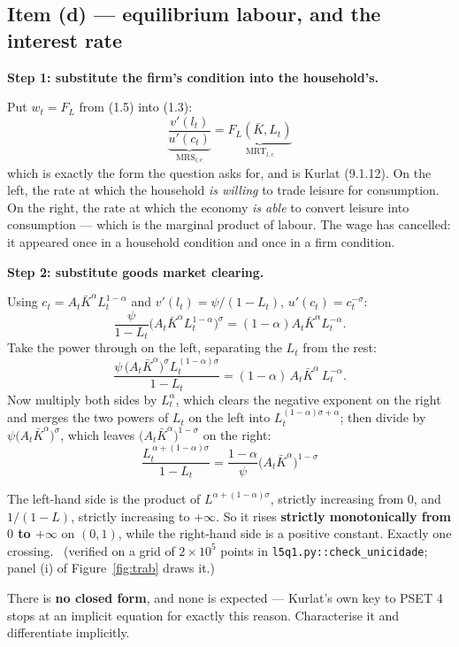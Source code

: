 \documentclass[11pt, a4paper]{article}
\newcommand{\passo}[1]{\medskip\noindent\textbf{#1}\par\nobreak}
\newcommand{\MRS}{\mathrm{MRS}}
\newcommand{\MRT}{\mathrm{MRT}}
\newcommand{\Kb}{\bar K}
\begin{document}
\subsection*{Item (d) --- equilibrium labour, and the interest rate}

\passo{Step 1: substitute the firm's condition into the household's.} Put $w_t=F_L$ from
(1.5) into (1.3):
\[
\boxed{\;
\underbrace{\frac{v'(l_t)}{u'(c_t)}}_{\textstyle \MRS_{l,c}}
=\underbrace{F_L(\Kb,L_t)}_{\textstyle \MRT_{l,c}}\;}
\tag{1.7}
\]
which is exactly the form the question asks for, and is Kurlat (9.1.12). On the left, the
rate at which the household \emph{is willing} to trade leisure for consumption. On the
right, the rate at which the economy \emph{is able} to convert leisure into consumption ---
which is the marginal product of labour. The wage has cancelled: it appeared once in a
household condition and once in a firm condition.

\passo{Step 2: substitute goods market clearing.} Using $c_t=A_t\Kb^{\alpha}L_t^{1-\alpha}$
and $v'(l_t)=\psi/(1-L_t)$, $u'(c_t)=c_t^{-\sigma}$:
\[
\frac{\psi}{1-L_t}\Big(A_t\Kb^{\alpha}L_t^{1-\alpha}\Big)^{\sigma}
=(1-\alpha)A_t\Kb^{\alpha}L_t^{-\alpha}.
\]
Take the power through on the left, separating the $L_t$ from the rest:
\[
\frac{\psi\,\big(A_t\Kb^{\alpha}\big)^{\sigma}L_t^{(1-\alpha)\sigma}}{1-L_t}
=(1-\alpha)\,A_t\Kb^{\alpha}\,L_t^{-\alpha}.
\]
Now multiply both sides by $L_t^{\alpha}$, which clears the negative exponent on the right
and merges the two powers of $L_t$ on the left into
$L_t^{(1-\alpha)\sigma+\alpha}$; then divide by $\psi\big(A_t\Kb^{\alpha}\big)^{\sigma}$,
which leaves $\big(A_t\Kb^{\alpha}\big)^{1-\sigma}$ on the right:
\[
\boxed{\;
\frac{L_t^{\,\alpha+(1-\alpha)\sigma}}{1-L_t}
=\frac{1-\alpha}{\psi}\Big(A_t\Kb^{\alpha}\Big)^{1-\sigma}\;}
\tag{1.8}
\]

\begin{tcolorbox}[planbox, title={Why (1.8) has exactly one solution --- say this}]
\small
The left-hand side is the product of $L^{\alpha+(1-\alpha)\sigma}$, strictly increasing
from $0$, and $1/(1-L)$, strictly increasing to $+\infty$. So it rises \textbf{strictly
monotonically from $0$ to $+\infty$} on $(0,1)$, while the right-hand side is a positive
constant. Exactly one crossing. \checkmark\ (verified on a grid of $2\times10^5$ points in
\texttt{l5q1.py::check\_unicidade}; panel (i) of Figure~\ref{fig:trab} draws it.)

\smallskip
There is \textbf{no closed form}, and none is expected --- Kurlat's own key to PSET 4 stops
at an implicit equation for exactly this reason. Characterise it and differentiate
implicitly.
\end{tcolorbox}
\end{document}
